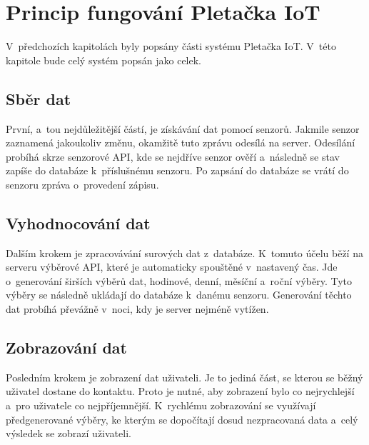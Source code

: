 \chapter{Princip fungování Pletačka IoT}
V~předchozích kapitolách byly popsány části systému Pletačka IoT.
V~této kapitole bude celý systém popsán jako celek.


\section{Sběr dat}
První, a~tou nejdůležitější částí, je získávání dat pomocí senzorů.
Jakmile senzor zaznamená jakoukoliv změnu, okamžitě tuto zprávu odesílá na server.
Odesílání probíhá skrze senzorové API, kde se nejdříve senzor ověří a~následně se stav zapíše do databáze k~příslušnému senzoru.
Po zapsání do databáze se vrátí do senzoru zpráva o~provedení zápisu. 


\section{Vyhodnocování dat}
Dalším krokem je zpracovávání surových dat z~databáze.
K~tomuto účelu běží na serveru výběrové API, které je automaticky spouštěné v~nastavený čas.
Jde o~generování širších výběrů dat, hodinové, denní, měsíční a~roční výběry.
Tyto výběry se následně ukládají do databáze k~danému senzoru.
Generování těchto dat probíhá převážně v~noci, kdy je server nejméně vytížen.


\section{Zobrazování dat}
Posledním krokem je zobrazení dat uživateli.
Je to jediná část, se kterou se běžný uživatel dostane do kontaktu.
Proto je nutné, aby zobrazení bylo co nejrychlejší a~pro uživatele co nejpříjemnější.
K~rychlému zobrazování se využívají předgenerované výběry, ke kterým se dopočítají dosud nezpracovaná data a~celý výsledek se zobrazí uživateli.





